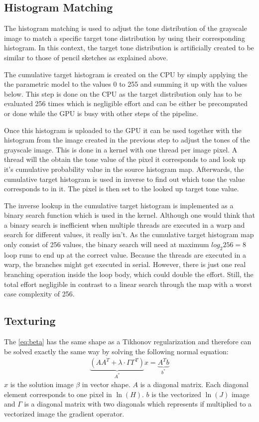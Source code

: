 \subsection{Histogram Matching}
The histogram matching is used to adjust the tone distribution of the 
grayscale image to match a specific target tone distribution by using
their corresponding histogram. In this context, the target tone
distribution is artificially created to be similar to those of pencil
sketches as explained above.

The cumulative target histogram is created on the CPU by simply applying
the the parametric model to the values 0 to 255 and summing it up with
the values below.
This step is done on the CPU as the target distribution only has to
be evaluated 256 times which is negligible effort and can be either be
precomputed or done while the GPU is busy with other steps of the pipeline.

Once this histogram is uploaded to the GPU it can be used together with
the histogram from the image created in the previous step to adjust the
tones of the grayscale image. This is done in a kernel with one thread
per image pixel. A thread will the obtain the tone value of the pixel
it corresponds to and look up it's cumulative probability value in
the source histogram map.
Afterwards, the cumulative target histogram is used in inverse to find
out which tone the value corresponds to in it. The pixel is then set to
the looked up target tone value.

The inverse lookup in the cumulative target histogram is implemented
as a binary search function which is used in the kernel. Although
one would think that a binary search is inefficient when multiple threads
are executed in a warp and search for different values, it really isn't.
As the cumulative target histogram map only consist of 256 values,
the binary search will need at maximum $log_2 256=8$ loop runs to end
up at the correct value. Because the threads are executed in a warp,
the branches might get executed in serial. However, there is just one 
real branching operation inside the loop body, which could double the
effort. Still, the total effort negligible in contrast to a linear search
through the map with a worst case complexity of 256.

\subsection{Texturing}
The \autoref{eq:beta} has the same shape as a Tikhonov regularization and
therefore can be solved exactly the same way by solving the following normal
equation:
\begin{align}
  \underbrace{(A A^T + \lambda \cdot \Gamma \Gamma^T)}_{A^*} x = \underbrace{A^T
  b}_{b^*}
  \label{eq:tikhonov}
\end{align}
$x$ is the solution image $\beta$ in vector shape. $A$ is a diagonal matrix.
Each diagonal element corresponds to one pixel in $\ln(H)$. $b$ is the
vectorized $\ln(J)$ image and $\Gamma$ is a diagonal matrix with two diagonals
which represents if multiplied to a vectorized image the gradient operator.

